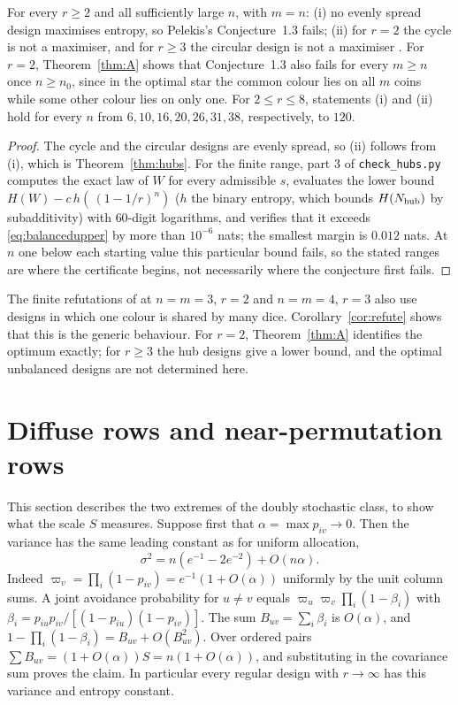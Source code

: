 \documentclass[11pt,a4paper]{article}
\theoremstyle{definition}\newtheorem{remark}[theorem]{Remark}\newtheorem{conjecture}{Conjecture}
\begin{document}
\begin{corollary}\label{cor:refute}
For every $r\ge2$ and all sufficiently large $n$, with $m=n$:
(i) no evenly spread design maximises entropy, so Pelekis's Conjecture~1.3 \cite[p.~122]{pelekis} fails;
(ii) for $r=2$ the cycle is not a maximiser, and for $r\ge3$ the circular design is not a maximiser \cite[pp.~123, 129]{pelekis}.
For $r=2$, Theorem~\ref{thm:A} shows that Conjecture~1.3 also fails for every $m\ge n$ once $n\ge n_0$, since in the optimal star the common colour lies on all $m$ coins while some other colour lies on only one.
For $2\le r\le8$, statements (i) and (ii) hold for every $n$ from $6,10,16,20,26,31,38$, respectively, to $120$.
\end{corollary}
\begin{proof}
The cycle and the circular designs are evenly spread, so (ii) follows from (i), which is Theorem~\ref{thm:hubs}. For the finite range, part 3 of \texttt{check\_hubs.py} computes the exact law of $W$ for every admissible $s$, evaluates the lower bound $H(W)-c\,h(\,(1-1/r)^n)$ ($h$ the binary entropy, which bounds $H(N_{\rm hub})$ by subadditivity) with $60$-digit logarithms, and verifies that it exceeds \eqref{eq:balancedupper} by more than $10^{-6}$ nats; the smallest margin is $0.012$ nats. At $n$ one below each starting value this particular bound fails, so the stated ranges are where the certificate begins, not necessarily where the conjecture first fails.
\end{proof}

The finite refutations of \cite{tt} at $n=m=3$, $r=2$ and $n=m=4$, $r=3$ also use designs in which one colour is shared by many dice. Corollary~\ref{cor:refute} shows that this is the generic behaviour. For $r=2$, Theorem~\ref{thm:A} identifies the optimum exactly; for $r\ge3$ the hub designs give a lower bound, and the optimal unbalanced designs are not determined here.

\section{Diffuse rows and near-permutation rows}\label{sec:regimes}
This section describes the two extremes of the doubly stochastic class, to show what the scale $S$ measures. Suppose first that $\alpha=\max p_{iv}\to0$. Then the variance has the same leading constant as for uniform allocation,
\[
                \sigma^2=n(e^{-1}-2e^{-2})+O(n\alpha).
\]
Indeed $\varpi_v=\prod_i(1-p_{iv})=e^{-1}(1+O(\alpha))$ uniformly by the unit column sums. A joint avoidance probability for $u\ne v$ equals $\varpi_u\varpi_v\prod_i(1-\beta_i)$ with $\beta_i=p_{iu}p_{iv}/[(1-p_{iu})(1-p_{iv})]$. The sum $B_{uv}=\sum_i\beta_i$ is $O(\alpha)$, and $1-\prod_i(1-\beta_i)=B_{uv}+O(B_{uv}^2)$. Over ordered pairs $\sum B_{uv}=(1+O(\alpha))S=n(1+O(\alpha))$, and substituting in the covariance sum proves the claim. In particular every regular design with $r\to\infty$ has this variance and entropy constant.
\end{document}
